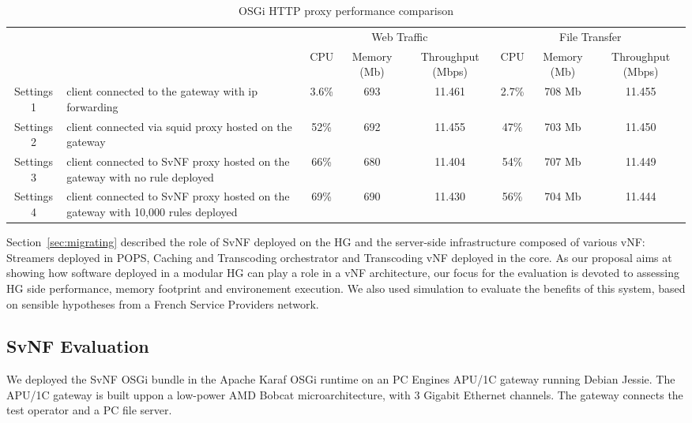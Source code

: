 \begin{table}
	\centering
	\begin{tabular}{| c | p{}|c |c |c || c |c |c |}
	
	
 	    \multicolumn{2}{c}{} & \multicolumn{3}{c}{Web Traffic} 		  & \multicolumn{3}{c}{File Transfer} \\
 	     \cline{3-8}	
             \multicolumn{2}{c|}{} & CPU 			& Memory (Mb) 		& Throughput (Mbps)	& CPU 		& Memory (Mb)		& Throughput (Mbps) \\\hline   
Settings 1 & client connected to the gateway with ip forwarding &   3.6\% 		& 693 		& 11.461		& 2.7\%		& 708 Mb		& 11.455 \\\hline
Settings 2 & client connected via squid proxy hosted on the gateway   &   52\%        & 692 		& 11.455		& 47\%		& 703 Mb		& 11.450 \\\hline
Settings 3 & client connected to SvNF proxy hosted on the gateway with no rule deployed &   66\%		& 680 		& 11.404		& 54\%		& 707 Mb		& 11.449 \\\hline
Settings 4 & client connected to SvNF proxy hosted on the gateway with 10,000 rules deployed   &   69\%        & 690 		& 11.430		& 56\%		& 704 Mb		& 11.444 \\\hline
	
	            
	\end{tabular}
	\caption{
	OSGi HTTP proxy performance comparison
	\label{tab:perf-comparison}
	}
	
\end{table}

Section~\ref{sec:migrating} described the role of SvNF deployed on the HG and the server-side infrastructure composed of various vNF: Streamers deployed in POPS, Caching and Transcoding orchestrator and Transcoding vNF deployed in the core.
As our proposal aims at showing how software deployed in a modular HG can play a role in a vNF architecture, our focus for the evaluation is devoted to assessing HG side performance, memory footprint and environement execution. We also used simulation to evaluate the benefits of this system, based on sensible hypotheses from a French Service Providers network.


\subsection{SvNF Evaluation }\label{Testbed}

We deployed the SvNF OSGi bundle in the Apache Karaf OSGi runtime on an PC Engines APU/1C gateway running Debian Jessie. 
The APU/1C gateway is built uppon a low-power AMD Bobcat microarchitecture, with 3 Gigabit Ethernet channels. The gateway connects the test operator and a PC file server.


